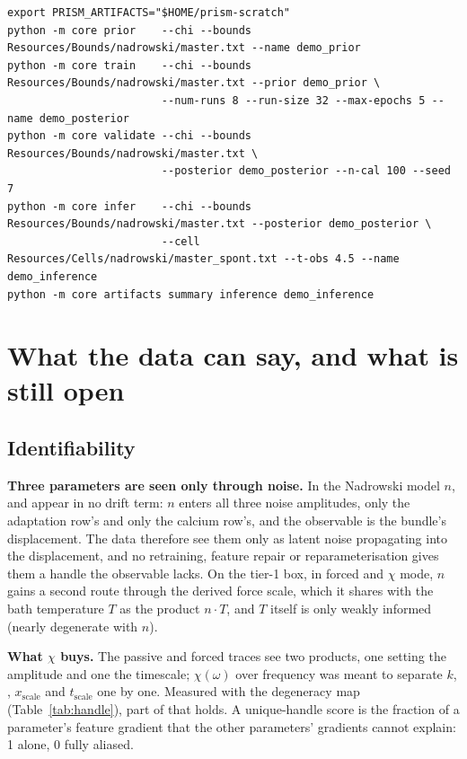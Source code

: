 \documentclass[10pt,a4paper]{article}
\newcommand{\code}[1]{\texttt{\detokenize{#1}}}
\newcommand{\tscale}{t_{\mathrm{scale}}}
\begin{document}
{\scriptsize
\begin{verbatim}
export PRISM_ARTIFACTS="$HOME/prism-scratch"
python -m core prior    --chi --bounds Resources/Bounds/nadrowski/master.txt --name demo_prior
python -m core train    --chi --bounds Resources/Bounds/nadrowski/master.txt --prior demo_prior \
                        --num-runs 8 --run-size 32 --max-epochs 5 --name demo_posterior
python -m core validate --chi --bounds Resources/Bounds/nadrowski/master.txt \
                        --posterior demo_posterior --n-cal 100 --seed 7
python -m core infer    --chi --bounds Resources/Bounds/nadrowski/master.txt --posterior demo_posterior \
                        --cell Resources/Cells/nadrowski/master_spont.txt --t-obs 4.5 --name demo_inference
python -m core artifacts summary inference demo_inference
\end{verbatim}
}

\section{What the data can say, and what is still open}\label{sec:caveats}

\subsection{Identifiability}

\textbf{Three parameters are seen only through noise.} In the Nadrowski model $n$, \code{temp} and \code{tau_c} appear in no
drift term: $n$ enters all three noise amplitudes, \code{temp} only the adaptation row's and \code{tau_c} only the calcium
row's, and the observable is the bundle's displacement. The data therefore see them only as latent noise propagating into
the displacement, and no retraining, feature repair or reparameterisation gives them a handle the observable lacks. On the
tier-1 box, in forced and $\chi$ mode, $n$ gains a second route through the derived force scale, which it shares with the bath
temperature $T$ as the product $n\cdot T$, and $T$ itself is only weakly informed (nearly degenerate with $n$).

\textbf{What $\chi$ buys.} The passive and forced traces see two products, one setting the amplitude and one the timescale;
$\chi(\omega)$ over frequency was meant to separate $k$, \code{lam}, $x_{\mathrm{scale}}$ and $\tscale$ one by one. Measured with the
degeneracy map (Table~\ref{tab:handle}), part of that holds. A unique-handle score is the fraction of a parameter's feature
gradient that the other parameters' gradients cannot explain: 1 alone, 0 fully aliased.
\end{document}
